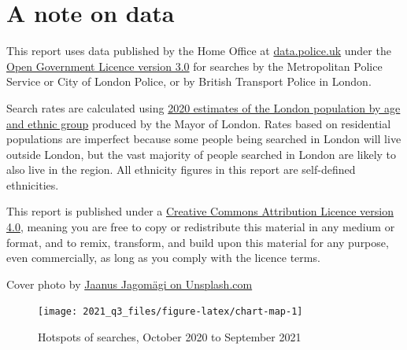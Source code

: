 \documentclass[
  a4paper,
  twoside, 11pt]{article}
\begin{document}
\hypertarget{a-note-on-data}{%
\section{A note on data}\label{a-note-on-data}}

This report uses data published by the Home Office at \href{https://data.police.uk/}{data.police.uk} under the \href{https://www.nationalarchives.gov.uk/doc/open-government-licence/version/3/}{Open Government Licence version 3.0} for searches by the Metropolitan Police Service or City of London Police, or by British Transport Police in London.

Search rates are calculated using \href{https://data.london.gov.uk/dataset/ethnic-group-population-projections}{2020 estimates of the London population by age and ethnic group} produced by the Mayor of London. Rates based on residential populations are imperfect because some people being searched in London will live outside London, but the vast majority of people searched in London are likely to also live in the region. All ethnicity figures in this report are self-defined ethnicities.

This report is published under a \href{https://creativecommons.org/licenses/by/4.0/}{Creative Commons Attribution Licence version 4.0}, meaning you are free to copy or redistribute this material in any medium or format, and to remix, transform, and build upon this material for any purpose, even commercially, as long as you comply with the licence terms.

Cover photo by \href{https://unsplash.com/photos/Dymu1WiZVko}{Jaanus Jagomägi on Unsplash.com}




\begin{figure}[tb]

{\centering \texttt{[image: 2021\_q3\_files/figure-latex/chart-map-1]} 

}

\caption{Hotspots of searches, October 2020 to September 2021}\label{fig:chart-map}
\end{figure}

\restoregeometry
\end{document}
